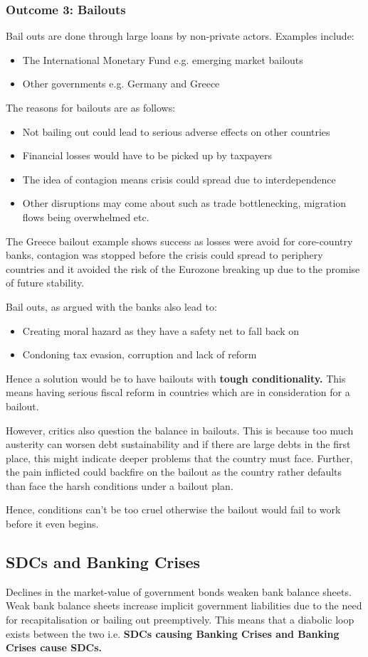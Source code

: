 \documentclass[12pt, letterpaper]{article}
\begin{document}
\subsubsection{Outcome 3: Bailouts}
Bail outs are done through large loans by non-private actors. Examples include:
\begin{itemize}
	\item The International Monetary Fund e.g. emerging market bailouts
	\item Other governments e.g. Germany and Greece
\end{itemize}
The reasons for bailouts are as follows:
\begin{itemize}
	\item Not bailing out could lead to serious adverse effects on other countries
	\item Financial losses would have to be picked up by taxpayers
	\item The idea of contagion means crisis could spread due to interdependence
	\item Other disruptions may come about such as trade bottlenecking, migration flows being overwhelmed etc.
\end{itemize}
The Greece bailout example shows success as losses were avoid for core-country banks, contagion was stopped before the crisis could spread to periphery countries and it avoided the risk of the Eurozone breaking up due to the promise of future stability.

Bail outs, as argued with the banks also lead to:
\begin{itemize}
	\item Creating moral hazard as they have a safety net to fall back on
	\item Condoning tax evasion, corruption and lack of reform
\end{itemize}
Hence a solution would be to have bailouts with \textbf{tough conditionality.} This means having serious fiscal reform in countries which are in consideration for a bailout.

However, critics also question the balance in bailouts. This is because too much austerity can worsen debt sustainability and if there are large debts in the first place, this might indicate deeper problems that the country must face. Further, the pain inflicted could backfire on the bailout as the country rather defaults than face the harsh conditions under a bailout plan.

Hence, conditions can't be too cruel otherwise the bailout would fail to work before it even begins.

\subsection{SDCs and Banking Crises}
Declines in the market-value of government bonds weaken bank balance sheets. Weak bank balance sheets increase implicit government liabilities due to the need for recapitalisation or bailing out preemptively. This means that a diabolic loop exists between the two i.e. \textbf{SDCs causing Banking Crises and Banking Crises cause SDCs.}
\end{document}
